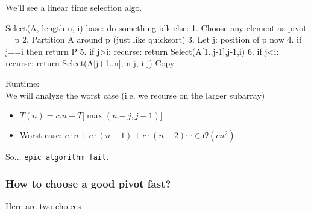 \documentclass[a4paper
]{article}
\newenvironment{Shaded}{}{}
\newcommand{\NormalTok}[1]{#1}
\providecommand{\tightlist}{%
  \setlength{\itemsep}{0pt}\setlength{\parskip}{0pt}}
\begin{document}
We'll see a linear time selection algo.

\begin{Shaded}
\begin{Highlighting}[]
\NormalTok{Select(A, length n, i)}
\NormalTok{    base: do something idk}
\NormalTok{    else:}
\NormalTok{        1. Choose any element as pivot = p}
\NormalTok{        2. Partition A around p (just like quicksort)}
\NormalTok{        3. Let j: position of p now}
\NormalTok{        4. if j==i then return P}
\NormalTok{        5. if j\textgreater{}i: recurse: return Select(A[1..j{-}1],j{-}1,i)}
\NormalTok{        6. if j\textless{}i: recurse: return Select(A[j+1..n], n{-}j, i{-}j)}
\NormalTok{Copy}
\end{Highlighting}
\end{Shaded}

Runtime:\\
We will analyze the worst case (i.e. we recurse on the larger subarray)

\begin{itemize}
\tightlist
\item
  {\(T(n) = c.n + T\lbrack\max(n - j,j - 1)\rbrack\)}
\item
  Worst case:
  {\(c \cdot n + c \cdot (n - 1) + c \cdot (n - 2)\cdots \in \mathcal{O}(cn^{2})\)}
\end{itemize}

So... \texttt{epic\ algorithm\ fail}.

\hypertarget{how-to-choose-a-good-pivot-fast}{%
\subsubsection{How to choose a good pivot
fast?}\label{how-to-choose-a-good-pivot-fast}}

Here are two choices
\end{document}
